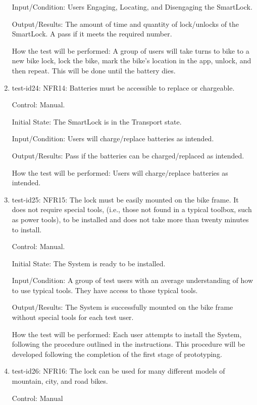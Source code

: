 \documentclass[12pt, titlepage]{article}
\begin{document}
\begin{enumerate}
Input/Condition: Users Engaging, Locating, and Disengaging the SmartLock.

Output/Results: The amount of time and quantity of lock/unlocks of the SmartLock. A pass if it meets the required number.

How the test will be performed:  A group of users will take turns to bike to a new bike lock, lock the bike, mark the bike's location in the app, unlock, and then repeat. This will be done until the battery dies.

\item{test-id24: NFR14: Batteries must be accessible to replace or chargeable. \\}

Control: Manual.

Initial State: The SmartLock is in the Transport state.

Input/Condition: Users will charge/replace batteries as intended.

Output/Results: Pass if the batteries can be charged/replaced as intended.

How the test will be performed: Users will charge/replace batteries as intended.

\item{test-id25: NFR15: The lock must be easily mounted on the bike frame. It does not require special tools, (i.e., those not found in a typical toolbox, such as power tools), to be installed and does not take more than twenty minutes to install.  \\}

Control: Manual.

Initial State: The System is ready to be installed.  

Input/Condition: A group of test users with an average understanding of how to use typical tools. They have access to those typical tools. 

Output/Results: The System is successfully mounted on the bike frame without special tools for each test user. 

How the test will be performed: Each user attempts to install the System, following the procedure outlined in the instructions. This procedure will be developed following the completion of the first stage of prototyping. 

\item{test-id26: NFR16: The lock can be used for many different models of mountain, city, and road bikes.  \\}

Control: Manual 


\end{enumerate}
\end{document}
